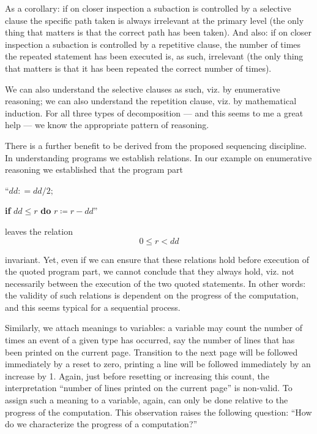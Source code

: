 As a corollary: if on closer inspection a subaction is controlled by a selective clause the specific path taken is always irrelevant at the primary level (the only thing that matters is that the correct path has been taken). And also: if on closer inspection a subaction is controlled by a repetitive clause, the number of times the repeated statement has been executed is, as such, irrelevant (the only thing that matters is that it has been repeated the correct number of times).

We can also understand the selective clauses as such, viz. by enumerative reasoning; we can also understand the repetition clause, viz. by mathematical induction. For all three types of decomposition --- and this seems to me a great help --- we know the appropriate pattern of reasoning.

There is a further benefit to be derived from the proposed sequencing discipline. In understanding programs we establish relations. In our example on enumerative reasoning we established that the program part
\medskip

{
	\setlength{\parindent}{8em}
	\hspace{-.5em}``$dd: = dd/2;$
	
	\textbf{if} $dd \leqslant r$ \textbf{do} $r \coloneq r - dd$''
}
\medskip

\noindent
leaves the relation
$$
0 \leqslant r < dd
$$

\noindent
invariant. Yet, even if we can ensure that these relations hold before execution of the quoted program part, we cannot conclude that they always hold, viz. not necessarily between the execution of the two quoted statements. In other words: the validity of such relations is dependent on the progress of the computation, and this seems typical for a sequential process.

Similarly, we attach meanings to variables: a variable may count the number of times an event of a given type has occurred, say the number of lines that has been printed on the current page. Transition to the next page will be followed immediately by a reset to zero, printing a line will be followed immediately by an increase by 1. Again, just before resetting or increasing this count, the interpretation ``number of lines printed on the current page'' is non-valid. To assign such a meaning to a variable, again, can only be done relative to the progress of the computation. This observation raises the following question: ``How do we characterize the progress of a computation?''

